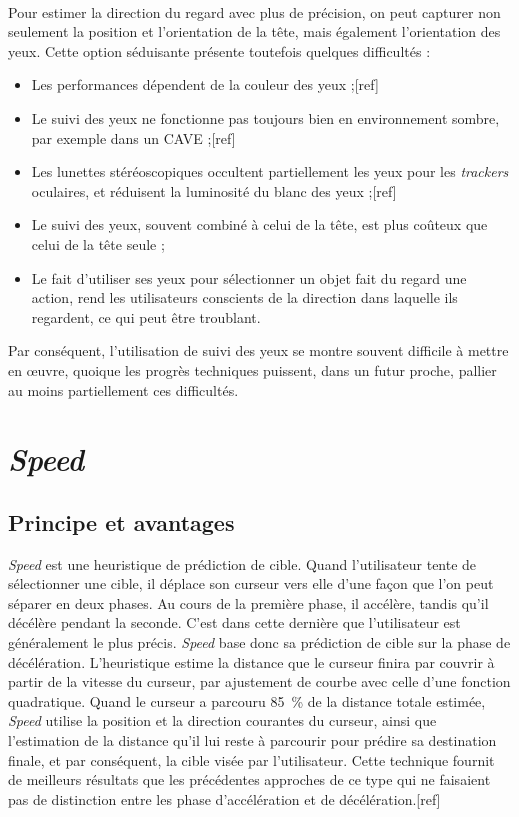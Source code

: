 	\paragraph{}
	Pour estimer la direction du regard avec plus de précision, on peut capturer non seulement la position et l'orientation de la tête, mais également l'orientation des yeux. Cette option séduisante présente toutefois quelques difficultés :
	\begin{itemize}
		\item Les performances dépendent de la couleur des yeux ;[ref]
		\item Le suivi des yeux ne fonctionne pas toujours bien en environnement sombre, par exemple dans un CAVE ;[ref]
		\item Les lunettes stéréoscopiques occultent partiellement les yeux pour les \emph{trackers} oculaires, et réduisent la luminosité du blanc des yeux ;[ref]
		\item Le suivi des yeux, souvent combiné à celui de la tête, est plus coûteux que celui de la tête seule ;
		\item Le fait d'utiliser ses yeux pour sélectionner un objet fait du regard une action, rend les utilisateurs conscients de la direction dans laquelle ils regardent, ce qui peut être troublant.
	\end{itemize}

	Par conséquent, l'utilisation de suivi des yeux se montre souvent difficile à mettre en œuvre, quoique les progrès techniques puissent, dans un futur proche, pallier au moins partiellement ces difficultés.
		
\section{\emph{Speed}}
	\subsection{Principe et avantages}
	\emph{Speed} est une heuristique de prédiction de cible. Quand l'utilisateur tente de sélectionner une cible, il déplace son curseur vers elle d'une façon que l'on peut séparer en deux phases. Au cours de la première phase, il accélère, tandis qu'il décélère pendant la seconde. C'est dans cette dernière que l'utilisateur est généralement le plus précis. \emph{Speed} base donc sa prédiction de cible sur la phase de décélération. L'heuristique estime la distance que le curseur finira par couvrir à partir de la vitesse du curseur, par ajustement de courbe avec celle d'une fonction quadratique. Quand le curseur a parcouru 85~\%{} de la distance totale estimée, \emph{Speed} utilise la position et la direction courantes du curseur, ainsi que l'estimation de la distance qu'il lui reste à parcourir pour prédire sa destination finale, et par conséquent, la cible visée par l'utilisateur. Cette technique fournit de meilleurs résultats que les précédentes approches de ce type qui ne faisaient pas de distinction entre les phase d'accélération et de décélération.[ref]
			
